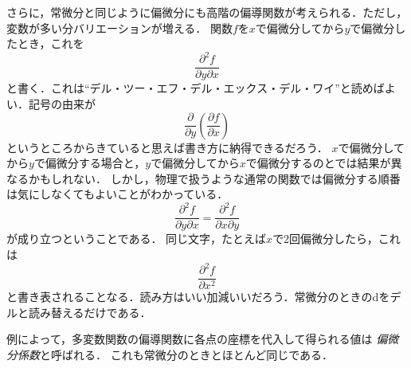さらに，常微分と同じように偏微分にも高階の偏導関数が考えられる．ただし，変数が多い分バリエーションが増える．
関数$f$を$x$で偏微分してから$y$で偏微分したとき，これを
$$
\frac{\partial^2 f}{\partial y \partial x}
$$
と書く．これは``デル・ツー・エフ・デル・エックス・デル・ワイ''と読めばよい．記号の由来が
$$
 \frac{\partial}{\partial y} \left( \frac{\partial f}{\partial x} \right)
 $$
 というところからきていると思えば書き方に納得できるだろう．
 $x$で偏微分してから$y$で偏微分する場合と，$y$で偏微分してから$x$で偏微分するのとでは結果が異なるかもしれない．
 しかし，物理で扱うような通常の関数では偏微分する順番は気にしなくてもよいことがわかっている．
 $$
 \frac{\partial^2 f}{\partial y \partial x} = \frac{\partial^2 f}{\partial x \partial y}
 $$
 が成り立つということである．
 同じ文字，たとえば$x$で2回偏微分したら，これは
 $$
 \frac{\partial^2 f}{\partial x^2}
 $$
 と書き表されることなる．読み方はいい加減いいだろう．常微分のときのdをデルと読み替えるだけである．
 
例によって，多変数関数の偏導関数に各点の座標を代入して得られる値は
\emph{偏微分係数}と呼ばれる．
これも常微分のときとほとんど同じである．
